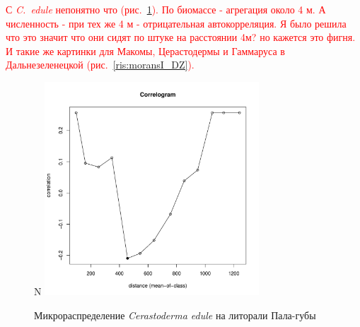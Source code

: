 \documentclass[12pt, a4paper]{disser}
\begin{document}
\textcolor{red}{С {\it C.~edule} непонятно что (рис.~\ref{ris:moransI_Pala_Cerastoderma}). По биомассе - агрегация около 4 м. А численность - при тех же 4 м - отрицательная автокорреляция. Я было решила что это значит что они сидят по штуке на расстоянии 4м? но кажется это фигня. И такие же картинки для Макомы, Церастодермы и Гаммаруса в Дальнезеленецкой (рис.~\ref{ris:moransI_DZ}).}

	\begin{figure}[h]
	\begin{minipage}[b]{.5\linewidth}
	\begin{center}
	{\small N}
		\includegraphics[width=80mm]{../Barenc_Sea/distribution_Moran/Pala_moran_N_Cerastoderma_edule_.pdf}
	\end{center}
	\end{minipage}

	\caption{Микрораспределение {\it Cerastoderma edule} на литорали Пала-губы}
	\label{ris:moransI_Pala_Cerastoderma}
	\end{figure}
\end{document}
